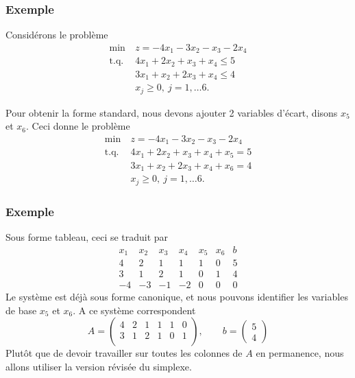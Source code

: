 \documentclass[usepdftitle=false]{beamer}
\begin{document}
\begin{frame}
\frametitle{Exemple}

Considérons le problème
\begin{align*}
\min\ &z = -4x_1 - 3x_2 -x_3 -2x_4 \\
\mbox{t.q. } & 4x_1 + 2x_2 + x_3 + x_4 \leq 5 \\
& 3x_1 + x_2 + 2x_3 + x_4 \leq 4 \\
& x_j \geq 0,\ j = 1,\ldots 6.
\end{align*}

Pour obtenir la forme standard, nous devons ajouter 2 variables d'écart, disons $x_5$ et $x_6$. Ceci donne le problème
\begin{align*}
\min\ &z = -4x_1 - 3x_2 -x_3 -2x_4 \\
\mbox{t.q. } & 4x_1 + 2x_2 + x_3 + x_4 + x_5 = 5 \\
& 3x_1 + x_2 + 2x_3 + x_4 + x_6 = 4 \\
& x_j \geq 0,\ j = 1,\ldots 6.
\end{align*}

\end{frame}

\begin{frame}
\frametitle{Exemple}

Sous forme tableau, ceci se traduit par
\[
\begin{matrix}
x_1 & x_2 & x_3 & x_4 & x_5 & x_6 & b \\
4 & 2 & 1 & 1 & 1 & 0 & 5 \\
3 & 1 & 2 & 1 & 0 & 1 & 4 \\
-4 & -3 & -1 & -2 & 0 & 0 & 0
\end{matrix}
\]
Le système est déjà sous forme canonique, et nous pouvons identifier les variables de base $x_5$ et $x_6$. A ce système correspondent
\[
A = \begin{pmatrix}
4 & 2 & 1 & 1 & 1 & 0 \\
3 & 1 & 2 & 1 & 0 & 1 \\
\end{pmatrix},\qquad
b = \begin{pmatrix} 5 \\ 4 \end{pmatrix}
\]
Plutôt que de devoir travailler sur toutes les colonnes de $A$ en permanence, nous allons utiliser la version révisée du simplexe.

\end{frame}
\end{document}
